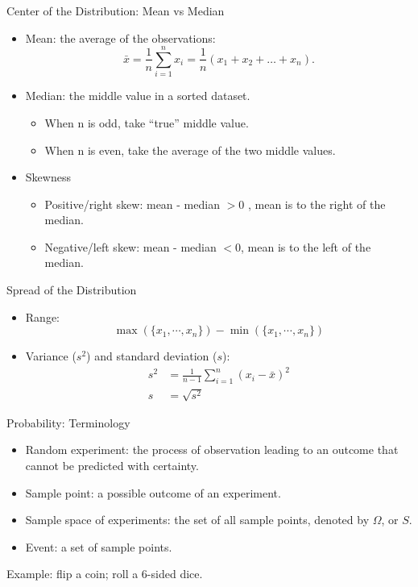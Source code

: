 \documentclass{beamer}
\begin{document}
\begin{frame}{Center of the Distribution: Mean vs Median}
\begin{itemize}
\item Mean: the average of the observations:
$$\bar x = \dfrac{1}{n} \sum_{i=1}^n x_i
=\dfrac{1}{n} \left(x_1+x_2 + \dots+x_n\right). $$
\item Median: the middle value in a \alert{sorted} dataset. 
\begin{itemize}
\item  When n is odd, take ``true'' middle value.
\item When n is even, take the average of the two middle values.
\end{itemize}
\item Skewness
    \begin{itemize}
\item Positive/right skew:   mean - median $>0$ , mean is to the right of the median. 
\item Negative/left skew:   mean - median $<0$, mean is to the left of the median. 
\end {itemize}
\end{itemize}
\end{frame}

\begin{frame}{Spread of the Distribution}
\begin{itemize}
\item Range:
    \[
        \max(\{x_1,\cdots,x_n\}) - \min(\{x_1,\cdots,x_n\})
    \]
\item Variance ($s^2$) and standard deviation ($s$):
    \begin{align*}
        s^2 &=\frac{1}{n-1}\sum_{i=1}^n (x_i-\bar x)^2 \\
        s &=\sqrt{s^2}
    \end{align*}

\end{itemize}
\end{frame}

\begin{frame}{Probability: Terminology}
\begin{itemize}
\item Random experiment: the process of observation leading to an outcome that cannot be predicted with certainty.
\item Sample point: a possible outcome of an experiment. 
\item Sample space of experiments: the set of all sample points, denoted by $\Omega$, or $S$.
\item Event: a set of sample points. 
\end{itemize}

Example: flip a coin; roll a 6-sided dice.
\end{frame}
\end{document}
